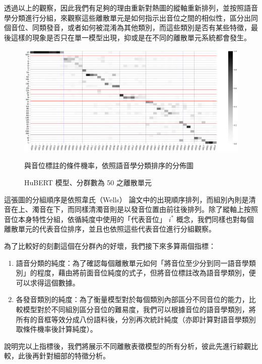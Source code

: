         透過以上的觀察，因此我們有足夠的理由重新對熱圖的縱軸重新排列，並按照語音學分類進行分組，來觀察這些離散單元是如何指示出音位之間的相似性，區分出同個音位、同類發音，或者如何被混淆為其他類別，而這些類別是否有某些特徵，最後這樣的現象是否只在單一模型出現，抑或是在不同的離散單元系統都會發生。

\begin{figure}
    \centering
    \includegraphics[width=1\linewidth]{figures/hubert-50-givenunit-byphn.png}
    \caption[]{%
        HuBERT 模型、分群數為 50 之離散單元}
                                與音位標註的條件機率，依照語音學分類排序的分佈圖
    \label{fig:hubert-50-givenunit-byphn}
\end{figure}

        這張圖的分組順序是依照韋氏（Wells） \cite{wells_phonetic_2022} 論文中的出現順序排列，而組別內則是清音在上、濁音在下，而同樣清濁音則是以發音位置由前往後排列。除了縱軸上按照音位本身特性分組，依循純度中使用的「代表音位」 $i^\ast$ 概念，我們同樣也對每個離散單元的代表音位排序，並且也依照這些代表音位進行分組觀察。

        為了比較好的刻劃這個在分群內的好壞，我們接下來多算兩個指標：\par
\begin{enumerate}
    \item 語音分類的純度：為了確認每個離散單元如何「將音位至少分到同一語音學類別」的程度，藉由將前面音位純度的式子，但將音位標註改為語音學類別，便可以求得這個數據。
    \item 各發音類別的純度：為了衡量模型對於每個類別內部區分不同音位的能力，比較模型對於不同組別區分音位的難易度，我們可以根據音位的語音學類別，將所有的音框等效分成八份語料後，分別再次統計純度（亦即計算對語音學類別取條件機率後計算純度）。
\end{enumerate}

        說明完以上指標後，我們將展示不同離散表徵模型的所有分析，彼此先進行綜觀比較，此後再針對細部的特徵分析。

